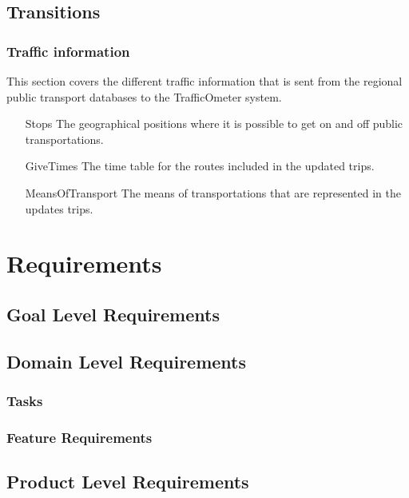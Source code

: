 \documentclass[a4paper]{article}
\begin{document}
		\subsection{Transitions} %
		\label{sub:transitions}
			\subsubsection{Traffic information} %
			\label{ssub:traffic_information}
			This section covers the different traffic information that is sent from the regional public transport databases to the TrafficOmeter system.
			\begin{itemize}
				\item[Stops] The geographical positions where it is possible to get on and off public transportations.
				\item[GiveTimes] The time table for the routes included in the updated trips.
				\item[MeansOfTransport] The means of transportations that are represented in the updates trips.
			\end{itemize}
		
	
	
	\section{Requirements}
		\subsection{Goal Level Requirements}
			
		\subsection{Domain Level Requirements}
			\subsubsection{Tasks}
				
			\subsubsection{Feature Requirements}
								
			
		\subsection{Product Level Requirements}		
\end{document}
